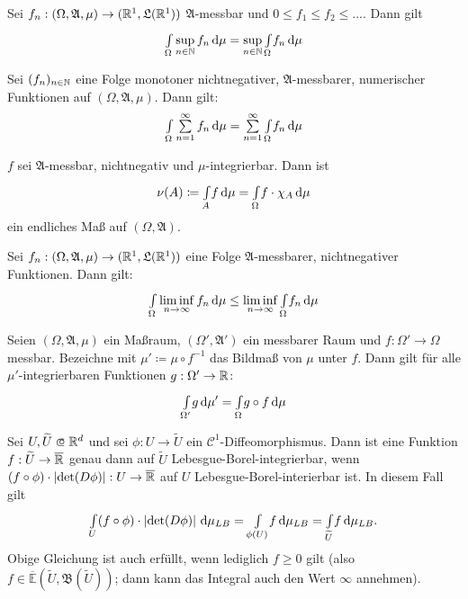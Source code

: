\documentclass{cheat-sheet}
\newcommand{\Alg}{\mathfrak{A}} %
\newcommand{\LebAlg}{\mathfrak{L}} %
\newcommand{\E}{\mathbb{E}} %
\newcommand{\ER}{\overline\R} %
\newcommand{\Bor}{\mathfrak{B}} %
\newcommand{\IntOmu}[1]{\Int{\Omega}{}{#1}{\mu}} %
\begin{document}


\begin{satz}
  Sei $f_n : (\Omega, \Alg, \mu) \to (\R^1, \LebAlg(\R^1))$ $\Alg$-messbar und $0 \leq f_1 \leq f_2 \leq ...$. Dann gilt
  \[ \IntOmu{\sup_{n \in \N} f_n} = \sup_{n \in \N} \IntOmu{f_n} \]
\end{satz}

\begin{satz}
  Sei $(f_n)_{n \in \mathbb{N}}$ eine Folge monotoner nichtnegativer, $\Alg$-messbarer, numerischer Funktionen auf $(\Omega, \Alg, \mu)$. Dann gilt:
  \[ \IntOmu{\sum_{n=1}^{\infty} f_n} = \sum_{n=1}^\infty \IntOmu{f_n} \]
\end{satz}

\begin{satz}
  $f$ sei $\Alg$-messbar, nichtnegativ und $\mu$-integrierbar. Dann ist
  \[ \nu(A) \coloneqq \Int{A}{}{f}{\mu} = \IntOmu{f \cdot \chi_A} \]
  ein endliches Maß auf $(\Omega, \Alg)$.
\end{satz}

\begin{satz}
  Sei $f_n : (\Omega, \Alg, \mu) \to (\R^1, \LebAlg(\R^1))$ eine Folge $\Alg$-messbarer, nichtnegativer Funktionen. Dann gilt:
  \[ \IntOmu{\liminf_{n \to \infty} f_n} \leq \liminf_{n \to \infty} \IntOmu{f_n} \]
\end{satz}




\begin{satz}
  Seien $(\Omega, \Alg, \mu)$ ein Maßraum, $(\Omega', \Alg')$ ein messbarer Raum und $f : \Omega' \to \Omega$ messbar. Bezeichne mit $\mu' \coloneqq \mu \circ f^{-1}$ das Bildmaß von $\mu$ unter $f$. Dann gilt für alle $\mu'$-integrierbaren Funktionen $g : \Omega' \to \mathbb{R}$:
  \[ \Int{\Omega'}{}{g}{\mu'} = \IntOmu{g \circ f} \]
\end{satz}

\begin{satz}[Transformationssatz]
  Sei $U, \widetilde{U} \opn \R^d$ und sei $\phi : U \to \widetilde{U}$ ein $\mathcal{C}^1$-Diffeomorphismus. Dann ist eine Funktion $f : \widetilde{U} \to \ER$ genau dann auf $\widetilde{U}$ Lebesgue-Borel-integrierbar, wenn $(f \circ \phi) \cdot \left|\det(D\phi)\right| : U \to \ER$ auf $U$ Lebesgue-Borel-interierbar ist. In diesem Fall gilt
  \[ {\textstyle \int\limits_{U}^{}} (f \circ \phi) \cdot \left|\det(D\phi)\right| \,\mathrm{d} \mu_{LB} = {\textstyle \int\limits_{\phi(U)}^{}} f \,\mathrm{d} \mu_{LB} = {\textstyle \int\limits_{\widetilde{U}}^{}} f \,\mathrm{d} \mu_{LB}. \]
  Obige Gleichung ist auch erfüllt, wenn lediglich $f \geq 0$ gilt (also $f \in \overline{\E}(\widetilde{U}, \Bor(\widetilde{U}))$; dann kann das Integral auch den Wert $\infty$ annehmen).
\end{satz}
\end{document}
